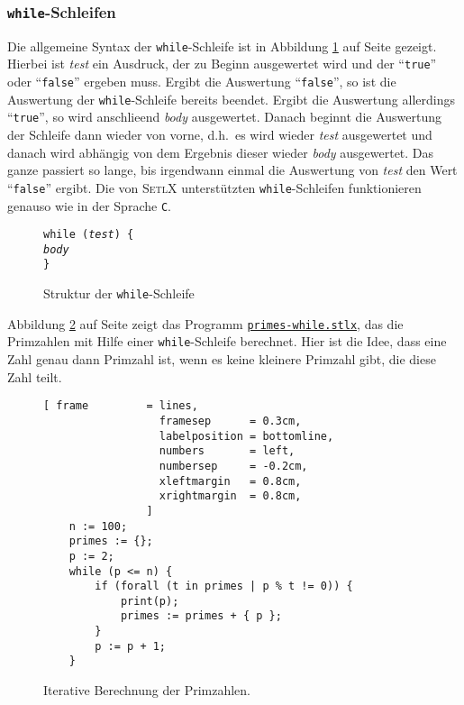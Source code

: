 \subsubsection{\texttt{while}-Schleifen}
Die allgemeine Syntax der \texttt{while}-Schleife ist in Abbildung \ref{fig:while} auf Seite
\pageref{fig:while} gezeigt.  Hierbei ist \textsl{test} ein Ausdruck, der zu
Beginn ausgewertet wird und der ``\texttt{true}'' oder ``\texttt{false}'' ergeben muss.
Ergibt die Auswertung ``\texttt{false}'', so ist die Auswertung der
\texttt{while}-Schleife bereits beendet. Ergibt die Auswertung allerdings
``\texttt{true}'', so wird anschlie\3end \textsl{body} ausgewertet.  Danach beginnt
die Auswertung der Schleife dann wieder von vorne, d.h.~es wird wieder
\textsl{test} ausgewertet und danach wird abh\"{a}ngig von dem Ergebnis dieser
wieder \textsl{body} ausgewertet.  Das ganze passiert so lange, bis irgendwann
einmal die Auswertung von \textsl{test} den Wert ``\texttt{false}'' ergibt.
Die von \textsc{SetlX} unterst\"{u}tzten \texttt{while}-Schleifen funktionieren genauso wie in
der Sprache \texttt{C}.

\begin{figure}[!ht]
  \centering
\begin{alltt}
      \texttt{while (}\textsl{test}\texttt{) \{}
          \textsl{body}
      \texttt{\}}
\end{alltt}
\vspace*{-0.3cm}
\caption{Struktur der \texttt{while}-Schleife}  \label{fig:while}
\end{figure} 

Abbildung \ref{fig:primes-while.stlx} auf Seite
\pageref{fig:primes-while.stlx} zeigt das Programm
\href{https://github.com/karlstroetmann/Logik/blob/master/SetlX/primes-while.stlx}{\texttt{primes-while.stlx}},
das die Primzahlen mit Hilfe einer \texttt{while}-Schleife berechnet.
Hier ist die Idee, dass eine Zahl genau dann Primzahl ist, wenn es keine
kleinere Primzahl gibt, die diese Zahl teilt.

\begin{figure}[!ht]
  \centering
\begin{Verbatim}[ frame         = lines, 
                  framesep      = 0.3cm, 
                  labelposition = bottomline,
                  numbers       = left,
                  numbersep     = -0.2cm,
                  xleftmargin   = 0.8cm,
                  xrightmargin  = 0.8cm,
                ]
    n := 100;
    primes := {};
    p := 2;
    while (p <= n) {
        if (forall (t in primes | p % t != 0)) {
            print(p);
            primes := primes + { p };
        }
        p := p + 1;
    }
\end{Verbatim} 
\vspace*{-0.3cm}
\caption{Iterative Berechnung der Primzahlen.}  \label{fig:primes-while.stlx}
\end{figure} %


